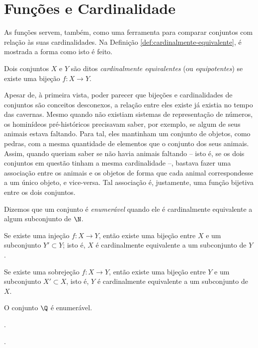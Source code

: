 \section{Funções e Cardinalidade}

As funções servem, também, como uma ferramenta para comparar conjuntos com relação às suas cardinalidades.
Na Definição \ref{def:cardinalmente-equivalente}, é mostrada a forma como isto é feito.

\begin{definition}
\label{def:cardinalmente-equivalente}
Dois conjuntos $X$ e $Y$ são ditos \emph{cardinalmente equivalentes}
(ou \emph{equipotentes}) se existe uma bijeção $f : X \to Y$.
\end{definition}

Apesar de, à primeira vista, poder parecer que bijeções e cardinalidades de conjuntos são conceitos desconexos, a relação entre eles existe já existia no tempo das cavernas.
Mesmo quando não existiam sistemas de representação de números, os hominídeos pré-históricos precisavam saber, por exemplo, se algum de seus animais estava faltando. 
Para tal, eles mantinham um conjunto de objetos, como pedras, com a mesma quantidade de elementos que o conjunto dos seus animais.
Assim, quando queriam saber se não havia animais faltando -- isto é, se os dois conjuntos em questão tinham a mesma cardinalidade --, bastava fazer uma associação entre os animais e os objetos de forma que cada animal correspondesse a um único objeto, e vice-versa.
Tal associação é, justamente, uma função bijetiva entre os dois conjuntos.

\begin{definition}
Dizemos que um conjunto é \emph{enumerável} quando ele é cardinalmente equivalente a algum subconjunto de $\N$.
\end{definition}

\begin{theorem}
Se existe uma injeção $f: X \to Y$, então existe uma bijeção entre $X$ e um subconjunto $Y' \subset Y$; isto é, $X$ é cardinalmente
equivalente a um subconjunto de $Y$.
\end{theorem}

\begin{theorem}
Se existe uma sobrejeção $f : X \to Y$, então existe uma bijeção entre $Y$ e um subconjunto $X' \subset X$, isto é, $Y$ é
cardinalmente equivalente a um subconjunto de $X$.
\end{theorem}

\begin{example}
	O conjunto $\Q$ é enumerável.
\end{example}

\begin{onlineact}
	.
\end{onlineact}

\begin{onlineact}
	.
\end{onlineact}